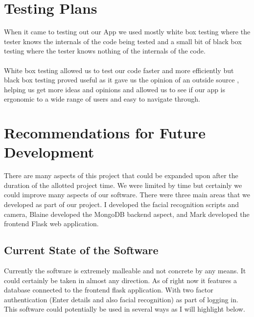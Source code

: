 \documentclass{article}
\begin{document}
\newpage

\section{Testing Plans}

When it came to testing out our App we used mostly white box testing where the tester knows the internals of the code being tested and a small bit of black box testing where the tester knows nothing of the internals of the code.
\\
\\
White box testing allowed us to test our code faster and more efficiently but black box testing proved useful as it gave us the opinion of an outside source  , helping us get more ideas and opinions and allowed us to see if our app is ergonomic to a wide range of users and easy to navigate through.

\newpage

\section{Recommendations for Future Development}
There are many aspects of this project that could be expanded upon after the duration of the allotted project time. We were limited by time but certainly we could improve many aspects of our software. There were three main areas that we developed as part of our project. I developed the facial recognition scripts and camera, Blaine developed the MongoDB backend aspect\cite{mongodb}, and Mark developed the frontend Flask web application.\cite{flask}
\\
\subsection{Current State of the Software}
Currently the software is extremely malleable and not concrete by any means. It could certainly be taken in almost any direction. As of right now it features a database connected to the frontend flask application. With two factor authentication (Enter details and also facial recognition) as part of logging in. This software could potentially be used in several ways as I will highlight below.
\end{document}
